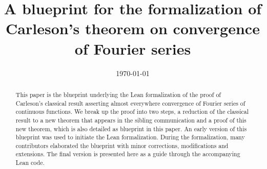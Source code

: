 
%
%

\title[Formalization of Carleson's theorem]{A blueprint for the formalization of Carleson's theorem on convergence of Fourier series}

\date{\today}

\begin{abstract}
This paper is the blueprint underlying the Lean formalization of the proof of Carleson's classical result \cite{carleson} asserting almost everywhere convergence of Fourier series of continuous functions. We break up the proof into two steps, a reduction of the classical result to a new theorem that appears in the sibling communication \cite{becker2024carlesonoperatorsdoublingmetric} and a proof of this new theorem, which is also detailed as blueprint in this paper. An early version of this blueprint was used to initiate the Lean formalization. During the formalization, many contributors elaborated the blueprint with minor corrections, modifications and extensions.
The final version is presented here as a guide through the accompanying Lean code.
\end{abstract}

\maketitle

\tableofcontents


